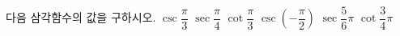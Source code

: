 다음 삼각함수의 값을 구하시오.
 $\csc\dfrac{\pi}{3}$
 $\sec\dfrac{\pi}{4}$
 $\cot\dfrac{\pi}{3}$
 $\csc\left(-\dfrac{\pi}{2}\right)$
 $\sec\dfrac{5}{6}\pi$
 $\cot\dfrac{3}{4}\pi$
